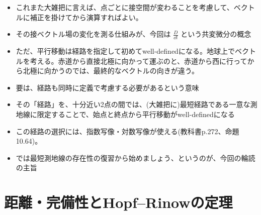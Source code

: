 \documentclass[a4paper,12pt,nomag,dvipdfmx,uplatex]{jsarticle}
\theoremstyle{plain}
\begin{document}
{    \begin{itemize}
        \item これまた大雑把に言えば、点ごとに接空間が変わることを考慮して、ベクトルに補正を掛けてから演算すればよい。
        \item その接ベクトル場の変化を測る仕組みが、今回は $\frac{D}{\dd{t}}$ という共変微分の概念
        \item ただ、平行移動は経路を指定して初めてwell-definedになる。地球上でベクトルを考える。赤道から直接北極に向かって運ぶのと、赤道から西に行ってから北極に向かうのでは、最終的なベクトルの向きが違う。
        \item 要は、経路も同時に定義で考慮する必要があるという意味
        \item その「経路」を、十分近い2点の間では、(大雑把に)最短経路である一意な測地線に限定することで、始点と終点から平行移動がwell-definedになる
        \item この経路の選択には、指数写像・対数写像が使える(教科書p.272、命題10.64)。
        \item では最短測地線の存在性の復習から始めましょう、というのが、今回の輪読の主旨
    \end{itemize}
}



\section{距離・完備性とHopf--Rinowの定理}
\label{sec:completeness}
\end{document}
